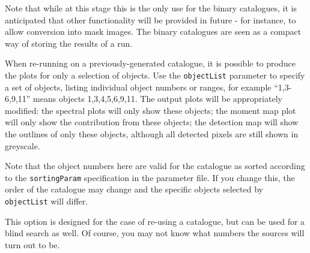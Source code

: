 Note that while at this stage this is the only use for the binary
catalogues, it is anticipated that other functionality will be
provided in future - for instance, to allow conversion into mask
images. The binary catalogues are seen as a compact way of storing the
results of a \duchamp run. 


When re-running \duchamp on a previously-generated catalogue, it is
possible to produce the plots for only a selection of objects. Use the
\texttt{objectList} parameter to specify a set of objects, listing
individual object numbers or ranges, for example ``1,3-6,9,11'' means
objects 1,3,4,5,6,9,11. The output plots will be appropriately
modified: the spectral plots will only show these objects; the moment
map plot will only show the contribution from these objects; the
detection map will show the outlines of only these objects, although
all detected pixels are still shown in greyscale. 

Note that the object numbers here are valid for the catalogue as
sorted according to the \texttt{sortingParam} specification in the
parameter file. If you change this, the order of the catalogue may
change and the specific objects selected by \texttt{objectList} will
differ. 

This option is designed for the case of re-using a catalogue, but can
be used for a blind search as well. Of course, you may not know what
numbers the sources will turn out to be.

